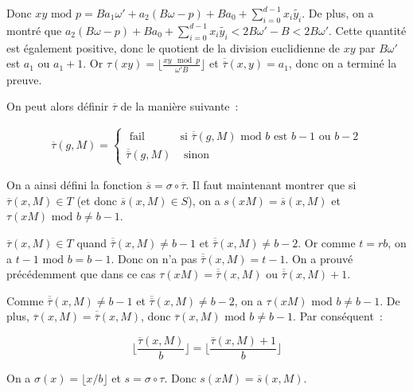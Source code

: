     Donc $xy \text{\ mod } p = B a_1\omega' + a_2(B\omega - p) + B a_0 + \sum_{i=0}^{d-1} x_i \tilde{y_i}$. De plus, on a montré que $a_2(B\omega - p) + B a_0 + \sum_{i=0}^{d-1} x_i \tilde{y_i} < 2B\omega' - B < 2B\omega'$. Cette quantité est également positive, donc le quotient de la division euclidienne de $xy$ par $B\omega'$ est $a_1$ ou $a_1 + 1$. Or $\tau(xy) = \lfloor \frac{xy\mod p}{\omega' B} \rfloor$ et $\overline{\overline{\tau}}(x,y) = a_1$, donc on a terminé la preuve.

    On peut alors définir $\overline{\tau}$ de la manière suivante~:

    \begin{align*}
      \overline{\tau}(g,M) =
      \begin{cases}
        \text{\ fail } & \text{si } \overline{\overline{\tau}}(g,M) \text{\ mod $b$ est $b - 1$ ou $b - 2$} \\
        \overline{\overline{\tau}}(g,M)  & \text{ sinon}
      \end{cases}
    \end{align*}

     On a ainsi défini la fonction $\overline{s} = \sigma \circ \overline{\tau}$.  Il faut maintenant montrer que si $\overline{\tau}(x,M) \in T$ (et donc $\overline{s}(x,M) \in S$), on a $s(xM)=\overline{s}(x,M)$ et $\tau(xM) \text{\ mod } b \neq b - 1$.

     $\overline{\tau}(x,M) \in T$ quand $\overline{\overline{\tau}}(x,M) \neq b - 1$ et $\overline{\overline{\tau}}(x,M) \neq b - 2$. Or comme $t = rb$, on a $t - 1 \text{\ mod } b = b - 1$. Donc on n'a pas $\overline{\overline{\tau}}(x,M) = t - 1$. On a prouvé précédemment que dans ce cas $\tau(xM) = \overline{\overline{\tau}}(x,M)$ ou $\overline{\overline{\tau}}(x,M) + 1$.

     Comme $\overline{\overline{\tau}}(x,M) \neq b - 1$ et $\overline{\overline{\tau}}(x,M) \neq b - 2$, on a $\tau(xM) \text{\ mod } b \neq b - 1$. De plus, $\overline{\tau}(x,M) = \overline{\overline{\tau}}(x,M)$, donc $\overline{\tau}(x,M) \text{\ mod } b \neq b - 1$. Par conséquent~:

     $$\lfloor \frac{\overline{\tau}(x,M)}{b} \rfloor = \lfloor \frac{\overline{\tau}(x,M) + 1}{b} \rfloor$$

     On a $\sigma(x) = \lfloor x/b \rfloor$ et $s= \sigma \circ \tau$. Donc $s(xM) = \overline{s}(x,M)$.
